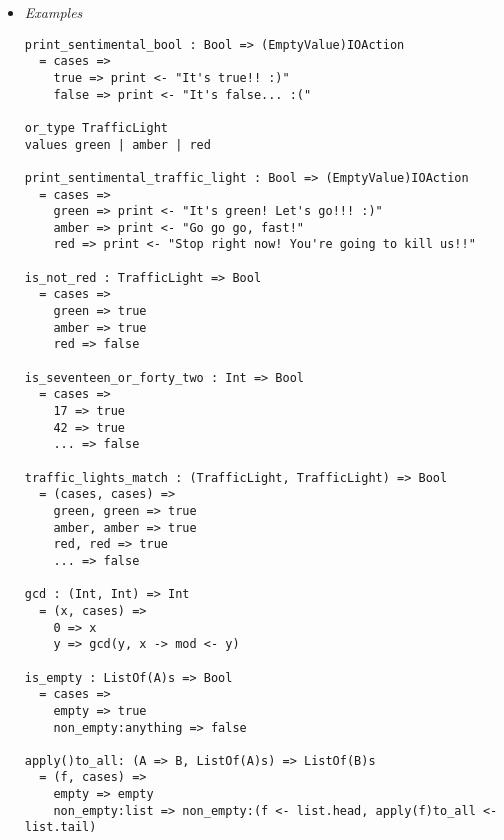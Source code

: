 \documentclass{article}
\begin{document}
\begin{itemize}
\item \textit{Examples}

\begin{verbatim}
print_sentimental_bool : Bool => (EmptyValue)IOAction
  = cases =>
    true => print <- "It's true!! :)"
    false => print <- "It's false... :("

or_type TrafficLight
values green | amber | red

print_sentimental_traffic_light : Bool => (EmptyValue)IOAction
  = cases =>
    green => print <- "It's green! Let's go!!! :)"
    amber => print <- "Go go go, fast!"
    red => print <- "Stop right now! You're going to kill us!!"

is_not_red : TrafficLight => Bool
  = cases =>
    green => true
    amber => true
    red => false

is_seventeen_or_forty_two : Int => Bool
  = cases => 
    17 => true
    42 => true
    ... => false
 
traffic_lights_match : (TrafficLight, TrafficLight) => Bool
  = (cases, cases) =>
    green, green => true
    amber, amber => true
    red, red => true
    ... => false

gcd : (Int, Int) => Int
  = (x, cases) =>
    0 => x
    y => gcd(y, x -> mod <- y) 

is_empty : ListOf(A)s => Bool
  = cases => 
    empty => true
    non_empty:anything => false

apply()to_all: (A => B, ListOf(A)s) => ListOf(B)s
  = (f, cases) =>
    empty => empty
    non_empty:list => non_empty:(f <- list.head, apply(f)to_all <- list.tail)

\end{verbatim}


\end{itemize}
\end{document}
